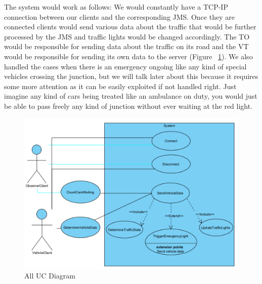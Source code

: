 \documentclass[17pt]{report}
\begin{document}
The system would work as follows: We would constantly have a TCP-IP connection
between our clients and the corresponding JMS. Once they are connected
clients would send various data about the traffic that would be further 
processed by the JMS and traffic lights would be changed accordingly. The
TO would be responsible for sending data about the traffic on its road and the 
VT would be responsible for sending its own data to the server (Figure ~\ref{fig:UC_DiagramAll}). 
We also handled the cases when there is an emergency ongoing like any kind of
special vehicles crossing the junction, but we will talk later about this
because it requires some more attention as it can be easily exploited if not 
handled right. Just imagine any kind of cars being treated like an ambulance
on duty, you would just be able to pass freely any kind of junction without 
ever waiting at the red light.\\

\begin{figure}[h!]
    \includegraphics[width=\textwidth]{UC/UCDiagram.png}
    \caption{All UC Diagram}
    \label{fig:UC_DiagramAll}
\end{figure}

\pagebreak
\end{document}
